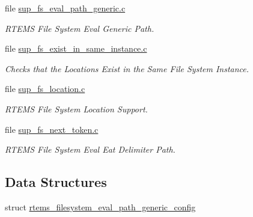 \begin{DoxyCompactItemize}
file \mbox{\hyperlink{sup__fs__eval__path__generic_8c}{sup\+\_\+fs\+\_\+eval\+\_\+path\+\_\+generic.\+c}}
\begin{DoxyCompactList}\small\item\em R\+T\+E\+MS File System Eval Generic Path. \end{DoxyCompactList}\item 
file \mbox{\hyperlink{sup__fs__exist__in__same__instance_8c}{sup\+\_\+fs\+\_\+exist\+\_\+in\+\_\+same\+\_\+instance.\+c}}
\begin{DoxyCompactList}\small\item\em Checks that the Locations Exist in the Same File System Instance. \end{DoxyCompactList}\item 
file \mbox{\hyperlink{sup__fs__location_8c}{sup\+\_\+fs\+\_\+location.\+c}}
\begin{DoxyCompactList}\small\item\em R\+T\+E\+MS File System Location Support. \end{DoxyCompactList}\item 
file \mbox{\hyperlink{sup__fs__next__token_8c}{sup\+\_\+fs\+\_\+next\+\_\+token.\+c}}
\begin{DoxyCompactList}\small\item\em R\+T\+E\+MS File System Eval Eat Delimiter Path. \end{DoxyCompactList}\end{DoxyCompactItemize}
\subsection*{Data Structures}
\begin{DoxyCompactItemize}
\item 
struct \mbox{\hyperlink{structrtems__filesystem__eval__path__generic__config}{rtems\+\_\+filesystem\+\_\+eval\+\_\+path\+\_\+generic\+\_\+config}}
\end{DoxyCompactItemize}
